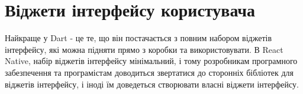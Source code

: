 \section{Віджети інтерфейсу користувача}\label{section.1.6}
Найкраще у Dart - це те, що він постачається з повним набором віджетів інтерфейсу, які можна підняти прямо з коробки та використовувати.
В React Native, набір віджетів інтерфейсу мінімальний, і тому розробникам програмного забезпечення та програмістам доводиться звертатися до сторонніх бібліотек для віджетів інтерфейсу, і іноді їм доведеться створювати власні віджети інтерфейсу. 
